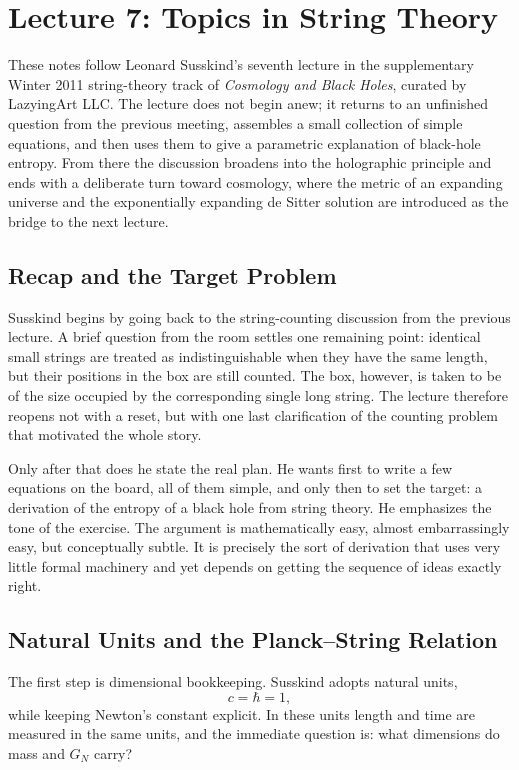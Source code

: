 \chapter{Lecture 7: Topics in String Theory}

These notes follow Leonard Susskind's seventh lecture in the supplementary Winter 2011 string-theory track of \emph{Cosmology and Black Holes}, curated by LazyingArt LLC. The lecture does not begin anew; it returns to an unfinished question from the previous meeting, assembles a small collection of simple equations, and then uses them to give a parametric explanation of black-hole entropy. From there the discussion broadens into the holographic principle and ends with a deliberate turn toward cosmology, where the metric of an expanding universe and the exponentially expanding de Sitter solution are introduced as the bridge to the next lecture.

\section{Recap and the Target Problem}

Susskind begins by going back to the string-counting discussion from the previous lecture. A brief question from the room settles one remaining point: identical small strings are treated as indistinguishable when they have the same length, but their positions in the box are still counted. The box, however, is taken to be of the size occupied by the corresponding single long string. The lecture therefore reopens not with a reset, but with one last clarification of the counting problem that motivated the whole story.

Only after that does he state the real plan. He wants first to write a few equations on the board, all of them simple, and only then to set the target: a derivation of the entropy of a black hole from string theory. He emphasizes the tone of the exercise. The argument is mathematically easy, almost embarrassingly easy, but conceptually subtle. It is precisely the sort of derivation that uses very little formal machinery and yet depends on getting the sequence of ideas exactly right.

\section{Natural Units and the Planck--String Relation}

The first step is dimensional bookkeeping. Susskind adopts natural units,
\begin{equation}
c=\hbar=1,
\end{equation}
while keeping Newton's constant explicit. In these units length and time are measured in the same units, and the immediate question is: what dimensions do mass and \(G_N\) carry?

